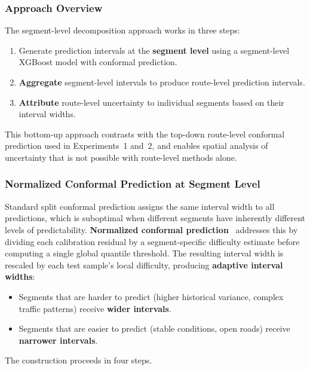 \subsubsection{Approach Overview}
\label{subsubsec:decomposition_overview}

The segment-level decomposition approach works in three steps:
\begin{enumerate}
    \item Generate prediction intervals at the \textbf{segment level} using a segment-level XGBoost model with conformal prediction.
    \item \textbf{Aggregate} segment-level intervals to produce route-level prediction intervals.
    \item \textbf{Attribute} route-level uncertainty to individual segments based on their interval widths.
\end{enumerate}

This bottom-up approach contrasts with the top-down route-level conformal prediction used in Experiments~1 and~2, and enables spatial analysis of uncertainty that is not possible with route-level methods alone.

\subsubsection{Normalized Conformal Prediction at Segment Level}
\label{subsubsec:normalized_cp}

Standard split conformal prediction assigns the same interval width to all predictions, which is suboptimal when different segments have inherently different levels of predictability. \textbf{Normalized conformal prediction}~\cite{papadopoulos2002inductive} addresses this by dividing each calibration residual by a segment-specific difficulty estimate before computing a single global quantile threshold. The resulting interval width is rescaled by each test sample's local difficulty, producing \textbf{adaptive interval widths}:

\begin{itemize}
    \item Segments that are harder to predict (higher historical variance, complex traffic patterns) receive \textbf{wider intervals}.
    \item Segments that are easier to predict (stable conditions, open roads) receive \textbf{narrower intervals}.
\end{itemize}

The construction proceeds in four steps.

